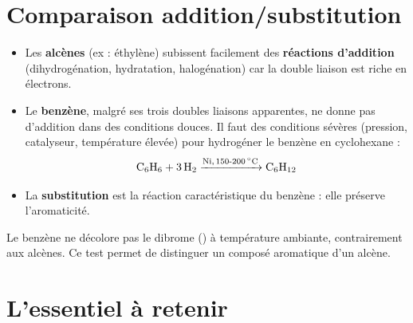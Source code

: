 \section{Comparaison addition/substitution}

\begin{propriete}
\begin{itemize}
    \item Les \textbf{alcènes} (ex : éthylène) subissent facilement des \textbf{réactions d'addition} (dihydrogénation, hydratation, halogénation) car la double liaison est riche en électrons.
    \item Le \textbf{benzène}, malgré ses trois doubles liaisons apparentes, ne donne pas d'addition dans des conditions douces. Il faut des conditions sévères (pression, catalyseur, température élevée) pour hydrogéner le benzène en cyclohexane :
    \[\ce{C6H6 + 3 H2 ->[Ni, 150-200\si{\celsius}] C6H12}\]
    \item La \textbf{substitution} est la réaction caractéristique du benzène : elle préserve l'aromaticité.
\end{itemize}
\end{propriete}

\begin{aretenir}
Le benzène ne décolore pas le dibrome () à température ambiante, contrairement aux alcènes. Ce test permet de distinguer un composé aromatique d'un alcène.
\end{aretenir}

\section{L'essentiel à retenir}

